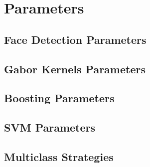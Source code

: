 \section{Parameters}

\subsection{Face Detection Parameters}

\subsection{Gabor Kernels Parameters}

\subsection{Boosting Parameters}

\subsection{SVM Parameters}

\subsection{Multiclass Strategies}
